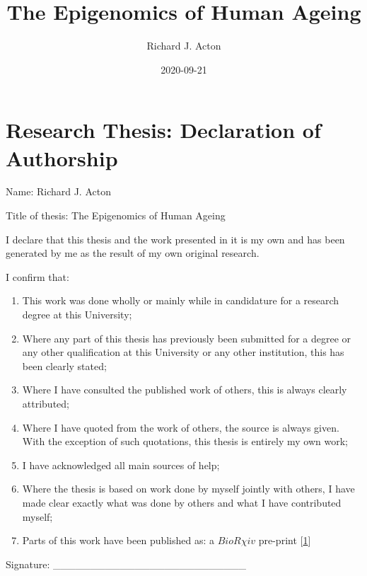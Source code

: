 \documentclass[
]{book}
\title{The Epigenomics of Human Ageing}
\subtitle{\textbf{Academic Unit:} Human Development and Health

\textbf{Supervisors:} Chris Bell, Karen Lillycrop and Cyrus Cooper}
\author{Richard J. Acton}
\date{2020-09-21}
\providecommand{\tightlist}{%
  \setlength{\itemsep}{0pt}\setlength{\parskip}{0pt}}
\begin{document}
\maketitle

{
\hypersetup{linkcolor=}
\setcounter{tocdepth}{4}
\tableofcontents
}
\newpage

\hypertarget{research-thesis-declaration-of-authorship}{%
\chapter*{Research Thesis: Declaration of Authorship}\label{research-thesis-declaration-of-authorship}}

Name: Richard J. Acton

Title of thesis: The Epigenomics of Human Ageing

I declare that this thesis and the work presented in it is my own and has been generated by me as the result of my own original research.

I confirm that:

\begin{enumerate}
\def\labelenumi{\arabic{enumi}.}
\tightlist
\item
  This work was done wholly or mainly while in candidature for a research degree at this University;
\item
  Where any part of this thesis has previously been submitted for a degree or any other qualification at this University or any other institution, this has been clearly stated;
\item
  Where I have consulted the published work of others, this is always clearly attributed;
\item
  Where I have quoted from the work of others, the source is always given. With the exception of such quotations, this thesis is entirely my own work;
\item
  I have acknowledged all main sources of help;
\item
  Where the thesis is based on work done by myself jointly with others, I have made clear exactly what was done by others and what I have contributed myself;
\item
  Parts of this work have been published as: a \(BioR \chi iv\) pre-print {[}\protect\hyperlink{ref-Acton2020}{1}{]}
\end{enumerate}

Signature: \_\_\_\_\_\_\_\_\_\_\_\_\_\_\_\_\_\_\_\_\_\_\_\_\_\_
\end{document}
